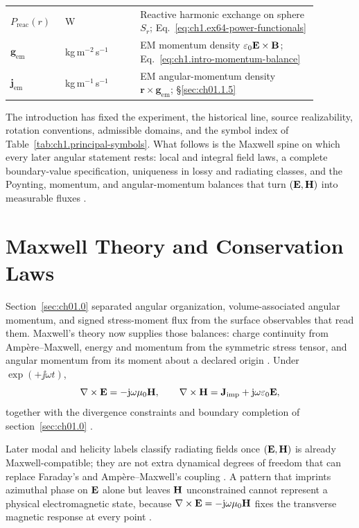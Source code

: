 \begin{table}[t]
\begin{tabular}{@{}p{0.14\linewidth}p{0.22\linewidth}p{0.52\linewidth}@{}}
$P_{\mathrm{reac}}(r)$ & W & Reactive harmonic exchange on sphere $S_r$; Eq.~\eqref{eq:ch1.ex64-power-functionals} \\
$\mathbf{g}_{\mathrm{em}}$ & kg\,m$^{-2}$\,s$^{-1}$ & EM momentum density $\varepsilon_0\mathbf{E}\times\mathbf{B}$; Eq.~\eqref{eq:ch1.intro-momentum-balance} \\
$\mathbf{j}_{\mathrm{em}}$ & kg\,m$^{-1}$\,s$^{-1}$ & EM angular-momentum density $\mathbf{r}\times\mathbf{g}_{\mathrm{em}}$; \S\ref{sec:ch01.1.5} \\
\hline
\end{tabular}
\end{table}

The introduction has fixed the experiment, the historical line, source realizability, rotation conventions, admissible domains, and the symbol index of Table~\ref{tab:ch1.principal-symbols}. What follows is the Maxwell spine on which every later angular statement rests: local and integral field laws, a complete boundary-value specification, uniqueness in lossy and radiating classes, and the Poynting, momentum, and angular-momentum balances that turn $(\mathbf{E},\mathbf{H})$ into measurable fluxes \cite{maxwell1873,stratton1941,harrington2001}.

\section{Maxwell Theory and Conservation Laws}
\label{sec:ch01.1}

Section~\ref{sec:ch01.0} separated angular organization, volume-associated angular momentum, and signed stress-moment flux from the surface observables that read them. Maxwell's theory now supplies those balances: charge continuity from Amp\`ere--Maxwell, energy and momentum from the symmetric stress tensor, and angular momentum from its moment about a declared origin \cite{maxwell1873,poynting1884,beth1936}. Under $\exp(+\jj\omega t)$,
\begin{equation}
\label{eq:ch1.maxwell-centre}
\nabla\times \mathbf{E}=-\mathrm{j}\omega\mu_0\mathbf{H},\qquad
\nabla\times \mathbf{H}=\mathbf{J}_{\mathrm{imp}}+\mathrm{j}\omega\varepsilon_0\mathbf{E},
\end{equation}
together with the divergence constraints and boundary completion of section~\ref{sec:ch01.0} \cite{stratton1941}.

Later modal and helicity labels classify radiating fields once $(\mathbf{E},\mathbf{H})$ is already Maxwell-compatible; they are not extra dynamical degrees of freedom that can replace Faraday's and Amp\`ere--Maxwell's coupling \cite{maxwell1873,jackson1999}. A pattern that imprints azimuthal phase on $\mathbf{E}$ alone but leaves $\mathbf{H}$ unconstrained cannot represent a physical electromagnetic state, because $\nabla\times\mathbf{E}=-\mathrm{j}\omega\mu_0\mathbf{H}$ fixes the transverse magnetic response at every point \cite{stratton1941}.

